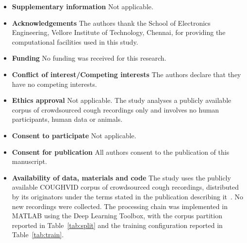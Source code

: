 \documentclass[pdflatex,sn-mathphys-num]{sn-jnl}
\begin{document}
\begin{itemize}
\item \textbf{Supplementary information} \; Not applicable.

\item \textbf{Acknowledgements} \; The authors thank the School of Electronics
Engineering, Vellore Institute of Technology, Chennai, for providing the
computational facilities used in this study.

\item \textbf{Funding} \; No funding was received for this research.

\item \textbf{Conflict of interest/Competing interests} \; The authors declare
that they have no competing interests.

\item \textbf{Ethics approval} \; Not applicable. The study analyses a
publicly available corpus of crowdsourced cough recordings only and involves
no human participants, human data or animals.

\item \textbf{Consent to participate} \; Not applicable.

\item \textbf{Consent for publication} \; All authors consent to the
publication of this manuscript.

\item \textbf{Availability of data, materials and code} \; The study uses the
publicly available COUGHVID corpus of crowdsourced cough recordings,
distributed by its originators under the terms stated in the publication
describing it~\cite{orlandic2021}. No new recordings were collected. The
processing chain was implemented in MATLAB using the Deep Learning Toolbox,
with the corpus partition reported in Table~\ref{tab:split} and the training
configuration reported in Table~\ref{tab:train}.
\end{itemize}
\end{document}
